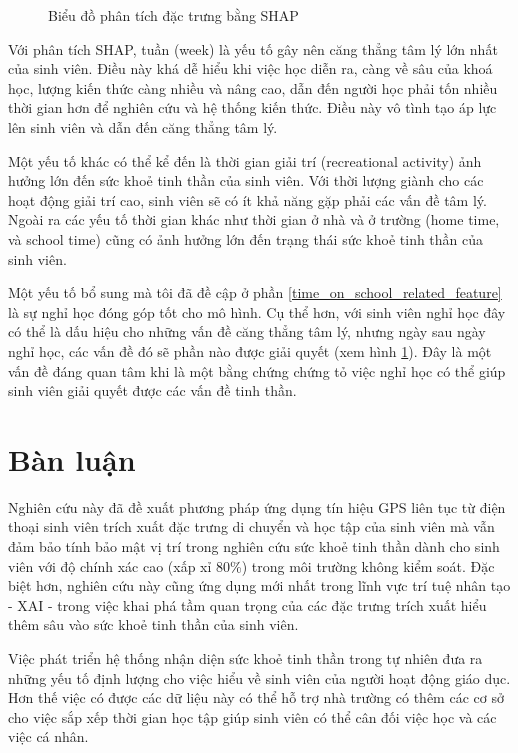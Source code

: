 \begin{figure}[!ht]
{}
\caption{Biểu đồ phân tích đặc trưng bằng SHAP}
\label{feat_imp}
\end{figure}

Với phân tích SHAP, tuần (week) là yếu tố gây nên căng thẳng tâm lý lớn nhất của sinh viên. Điều này khá dễ hiểu khi việc học diễn ra, càng về sâu của khoá học, lượng kiến thức càng nhiều và nâng cao, dẫn đến người học phải tốn nhiều thời gian hơn để nghiên cứu và hệ thống kiến thức. Điều này vô tình tạo áp lực lên sinh viên và dẫn đến căng thẳng tâm lý.

Một yếu tố khác có thể kể đến là thời gian giải trí (recreational activity) ảnh hưởng lớn đến sức khoẻ tinh thần của sinh viên. Với thời lượng giành cho các hoạt động giải trí cao, sinh viên sẽ có ít khả năng gặp phải các vấn đề tâm lý. Ngoài ra các yếu tố thời gian khác như thời gian ở nhà và ở trường (home time, và school time) cũng có ảnh hưởng lớn đến trạng thái sức khoẻ tinh thần của sinh viên.

Một yếu tố bổ sung mà tôi đã đề cập ở phần \ref{time_on_school_related_feature} là sự nghỉ học đóng góp tốt cho mô hình. Cụ thể hơn, với sinh viên nghỉ học đây có thể là dấu hiệu cho những vấn đề căng thẳng tâm lý, nhưng ngày sau ngày nghỉ học, các vấn đề đó sẽ phần nào được giải quyết (xem hình \ref{feat_imp}). Đây là một vấn đề đáng quan tâm khi là một bằng chứng chứng tỏ việc nghỉ học có thể giúp sinh viên giải quyết được các vấn đề tinh thần.


\section{Bàn luận}
Nghiên cứu này đã đề xuất phương pháp ứng dụng tín hiệu GPS liên tục từ điện thoại sinh viên trích xuất đặc trưng di chuyển và học tập của sinh viên mà vẫn đảm bảo tính bảo mật vị trí trong nghiên cứu sức khoẻ tinh thần dành cho sinh viên với độ chính xác cao (xấp xỉ 80\%) trong môi trường không kiểm soát. Đặc biệt hơn, nghiên cứu này cũng ứng dụng mới nhất trong lĩnh vực trí tuệ nhân tạo - XAI - trong việc khai phá tầm quan trọng của các đặc trưng trích xuất hiểu thêm sâu vào sức khoẻ tinh thần của sinh viên.

Việc phát triển hệ thống nhận diện sức khoẻ tinh thần trong tự nhiên đưa ra những yếu tố định lượng cho việc hiểu về sinh viên của người hoạt động giáo dục. Hơn thế việc có được các dữ liệu này có thể hỗ trợ nhà trường có thêm các cơ sở cho việc sắp xếp thời gian học tập giúp sinh viên có thể cân đối việc học và các việc cá nhân.

